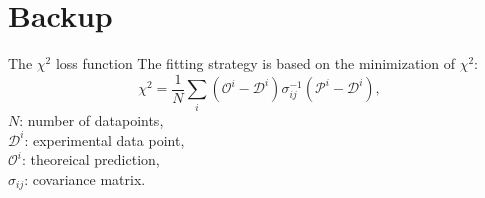 
\appendix

\section{Backup}


\begin{frame}{The $\chi^2$ loss function}
The fitting strategy is based on the minimization of $\chi^2$:
\begin{equation}
\chi^2=\frac{1}{N}\sum_{i}(\mathcal{O}^i-\mathcal{D}^i)\sigma_{ij}^{-1}(\mathcal{P}^i-\mathcal{D}^i),
\end{equation}
$N$: number of datapoints, \\
$\mathcal{D}^i$: experimental data point, \\
$\mathcal{O}^i$: theoreical prediction, \\
$\sigma_{ij}$: covariance matrix.
\end{frame}


